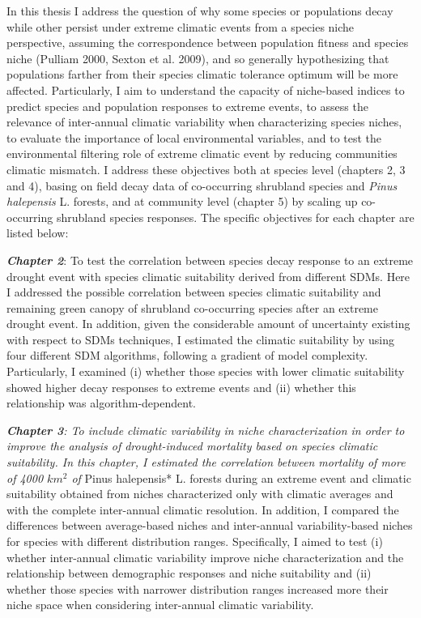 \documentclass[11pt,twoside]{reedthesis}
\begin{document}
\par

In this thesis I address the question of why some species or populations
decay while other persist under extreme climatic events from a species
niche perspective, assuming the correspondence between population
fitness and species niche (Pulliam 2000, Sexton et al. 2009), and so
generally hypothesizing that populations farther from their species
climatic tolerance optimum will be more affected. Particularly, I aim to
understand the capacity of niche-based indices to predict species and
population responses to extreme events, to assess the relevance of
inter-annual climatic variability when characterizing species niches, to
evaluate the importance of local environmental variables, and to test
the environmental filtering role of extreme climatic event by reducing
communities climatic mismatch. I address these objectives both at
species level (chapters 2, 3 and 4), basing on field decay data of
co-occurring shrubland species and \emph{Pinus halepensis} L. forests,
and at community level (chapter 5) by scaling up co-occurring shrubland
species responses. The specific objectives for each chapter are listed
below:\par

\textbf{\emph{Chapter 2}}: To test the correlation between species decay
response to an extreme drought event with species climatic suitability
derived from different SDMs. Here I addressed the possible correlation
between species climatic suitability and remaining green canopy of
shrubland co-occurring species after an extreme drought event. In
addition, given the considerable amount of uncertainty existing with
respect to SDMs techniques, I estimated the climatic suitability by
using four different SDM algorithms, following a gradient of model
complexity. Particularly, I examined (i) whether those species with
lower climatic suitability showed higher decay responses to extreme
events and (ii) whether this relationship was algorithm-dependent.\par

\emph{\textbf{Chapter 3}: To include climatic variability in niche
characterization in order to improve the analysis of drought-induced
mortality based on species climatic suitability. In this chapter, I
estimated the correlation between mortality of more of 4000 \(km^2\) of
}Pinus halepensis* L. forests during an extreme event and climatic
suitability obtained from niches characterized only with climatic
averages and with the complete inter-annual climatic resolution. In
addition, I compared the differences between average-based niches and
inter-annual variability-based niches for species with different
distribution ranges. Specifically, I aimed to test (i) whether
inter-annual climatic variability improve niche characterization and the
relationship between demographic responses and niche suitability and
(ii) whether those species with narrower distribution ranges increased
more their niche space when considering inter-annual climatic
variability.\par
\end{document}
